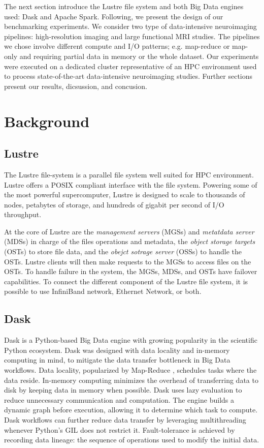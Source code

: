 \documentclass[conference]{IEEEtran}
\begin{document}
The next section introduce the Lustre file system and both Big Data engines used: Dask and Apache Spark.
Following, we present the design of our benchmarking experiments.
We consider two type of data-intensive neuroimaging pipelines: high-resolution imaging and large functional MRI studies.
The pipelines we chose involve different compute and I/O patterns; e.g. map-reduce or map-only and requiring partial data in memory or the whole dataset.
Our experiments were executed on a dedicated cluster representative of an HPC environment used to process state-of-the-art data-intensive neuroimaging studies.
Further sections present our results, dicsussion, and concusion.


\section{Background}
\subsection{Lustre}
The Lustre file-system is a parallel file system well suited for HPC environment.
Lustre offers a POSIX compliant interface with the file system.
Powering some of the most powerful supercomputer, Lustre is designed to scale to thousands of nodes, petabytes of storage, and hundreds of gigabit per second of I/O throughput.

At the core of Lustre are the \textit{management servers} (MGSs) and \textit{metatdata server} (MDSs) in charge of the files operations and metadata,
the \textit{object storage targets} (OSTs) to store file data, and the \textit{obejct sotrage server} (OSSs) to handle the OSTs.
Lustre clients will then make requests to the MGSs to access files on the OSTs.
To handle failure in the system, the MGSs, MDSs, and OSTs have failover capabilities.
To connect the different component of the Lustre file system, it is possible to use InfiniBand network, Ethernet Network, or both.

\subsection{Dask}
Dask is a Python-based Big Data engine with growing popularity in the scientific Python ecosystem.
Dask was designed with data locality and in-memory computing in mind, to mitigate the data transfer bottleneck in Big Data workflows.
Data locality, popularized by Map-Reduce \cite{dean2008mapreduce}, schedules tasks where the data reside.
In-memory computing minimizes the overhead of transferring data to disk by keeping data in memory when possible.
Dask uses lazy evaluation to reduce unnecessary communication and computation.
The engine builds a dynamic graph before execution, allowing it to determine which task to compute.
Dask workflows can further reduce data transfer by leveraging multithreading whenever Python's GIL does not restrict it.
Fault-tolerance is achieved by recording data lineage: the sequence of operations used to modify the initial data.
\end{document}

